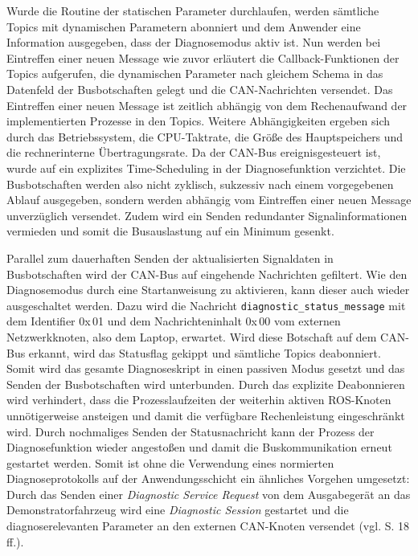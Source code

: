 Wurde die Routine der statischen Parameter durchlaufen, werden sämtliche Topics mit dynamischen Parametern abonniert und dem Anwender eine Information ausgegeben, dass der Diagnosemodus aktiv ist. Nun werden bei Eintreffen einer neuen Message wie zuvor erläutert die Callback-Funktionen der Topics aufgerufen, die dynamischen Parameter nach gleichem Schema in das Datenfeld der Busbotschaften gelegt und die CAN-Nachrichten versendet. Das Eintreffen einer neuen Message ist zeitlich abhängig von dem Rechenaufwand der implementierten Prozesse in den Topics. Weitere Abhängigkeiten ergeben sich durch das Betriebssystem, die CPU-Taktrate, die Größe des Hauptspeichers und die rechnerinterne Übertragungsrate. Da der CAN-Bus ereignisgesteuert ist, wurde auf ein explizites Time-Scheduling in der Diagnosefunktion verzichtet. Die Busbotschaften werden also nicht zyklisch, sukzessiv nach einem vorgegebenen Ablauf ausgegeben, sondern werden abhängig vom Eintreffen einer neuen Message unverzüglich versendet. Zudem wird ein Senden redundanter Signalinformationen vermieden und somit die Busauslastung auf ein Minimum gesenkt. 

Parallel zum dauerhaften Senden der aktualisierten Signaldaten in Busbotschaften wird der CAN-Bus auf eingehende Nachrichten gefiltert. Wie den Diagnosemodus durch eine Startanweisung zu aktivieren, kann dieser auch wieder ausgeschaltet werden. Dazu wird die Nachricht \texttt{diagnostic\_status\_message} mit dem Identifier 0x\,01 und dem Nachrichteninhalt 0x\,00 vom externen Netzwerkknoten, also dem Laptop, erwartet. Wird diese Botschaft auf dem CAN-Bus erkannt, wird das Statusflag gekippt und sämtliche Topics deabonniert. Somit wird das gesamte Diagnoseskript in einen passiven Modus gesetzt und das Senden der Busbotschaften wird unterbunden. Durch das explizite Deabonnieren wird verhindert, dass die Prozesslaufzeiten der weiterhin aktiven ROS-Knoten unnötigerweise ansteigen und damit die verfügbare Rechenleistung eingeschränkt wird. Durch nochmaliges Senden der Statusnachricht kann der Prozess der Diagnosefunktion wieder angestoßen und damit die Buskommunikation erneut gestartet werden. Somit ist ohne die Verwendung eines normierten Diagnoseprotokolls auf der Anwendungsschicht ein ähnliches Vorgehen umgesetzt: Durch das Senden einer \emph{Diagnostic Service Request} von dem Ausgabegerät an das Demonstratorfahrzeug wird eine \emph{Diagnostic Session} gestartet und die diagnoserelevanten Parameter an den externen CAN-Knoten versendet (vgl. \cite{Kary.12.09.2016} S. 18 ff.).

